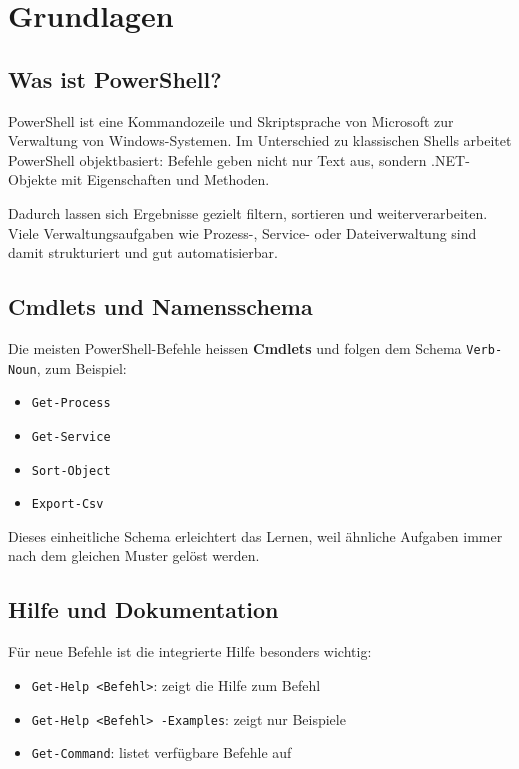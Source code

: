 \documentclass[11pt, oneside, numbers=noenddot]{scrbook}
\begin{document}

\tableofcontents
{}

\chapter{Grundlagen}

\section{Was ist PowerShell?}
PowerShell ist eine Kommandozeile und Skriptsprache von Microsoft zur Verwaltung von Windows-Systemen. Im Unterschied zu klassischen Shells arbeitet PowerShell objektbasiert: Befehle geben nicht nur Text aus, sondern .NET-Objekte mit Eigenschaften und Methoden.

Dadurch lassen sich Ergebnisse gezielt filtern, sortieren und weiterverarbeiten. Viele Verwaltungsaufgaben wie Prozess-, Service- oder Dateiverwaltung sind damit strukturiert und gut automatisierbar.

\section{Cmdlets und Namensschema}
Die meisten PowerShell-Befehle heissen \textbf{Cmdlets} und folgen dem Schema \texttt{Verb-Noun}, zum Beispiel:
\begin{itemize}
\item \texttt{Get-Process}
\item \texttt{Get-Service}
\item \texttt{Sort-Object}
\item \texttt{Export-Csv}
\end{itemize}

Dieses einheitliche Schema erleichtert das Lernen, weil ähnliche Aufgaben immer nach dem gleichen Muster gelöst werden.

\section{Hilfe und Dokumentation}
Für neue Befehle ist die integrierte Hilfe besonders wichtig:
\begin{itemize}
\item \texttt{Get-Help <Befehl>}: zeigt die Hilfe zum Befehl
\item \texttt{Get-Help <Befehl> -Examples}: zeigt nur Beispiele
\item \texttt{Get-Command}: listet verfügbare Befehle auf
\end{itemize}
\end{document}
